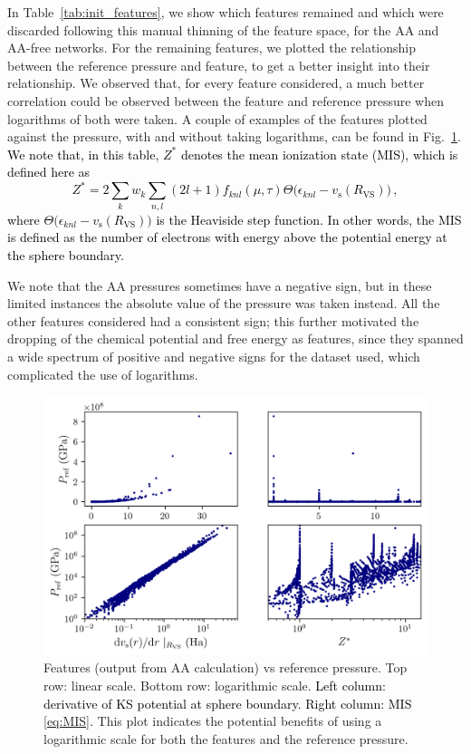 \documentclass[%
 preprint,
 superscriptaddress,
 amsmath,amssymb,
longbibliography,
]{revtex4-2}
\newcommand{\RWS}{R_\textrm{VS}}
\newcommand{\T}{\tau}
\newcommand{\change}[1]{\textcolor{black}{#1}}
\begin{document}
In Table~\ref{tab:init_features}, we show which features remained and which were discarded following this manual thinning of the feature space, for the AA and AA-free networks. For the remaining features, we plotted the relationship between the reference pressure and feature, to get a better insight into their relationship. We observed that, for every feature considered, a much better correlation could be observed between the feature and reference pressure when logarithms of both were taken. A couple of examples of the features plotted against the pressure, with and without taking logarithms, can be found in Fig.~\ref{fig:feature_correlation}. \change{ We note that, in this table, $Z^*$ denotes the mean ionization state (MIS), which is defined here as
\begin{equation} \label{eq:MIS}
    Z^* = 2\sum_{k} w_k \sum_{n,l} (2l+1) f_{knl}(\mu, \T) \Theta \big(\epsilon_{knl} - v_\textrm{s}(\RWS)\big)\,,
\end{equation}
where $\Theta\big(\epsilon_{knl} - v_\textrm{s}(\RWS)\big)$ is the Heaviside step function. In other words, the MIS is defined as the number of electrons with energy above the potential energy at the sphere boundary.}

We note that the AA pressures sometimes have a negative sign, but in these limited instances the absolute value of the pressure was taken instead. All the other features considered had a consistent sign; this further motivated the dropping of the chemical potential and free energy as features, since they spanned a wide spectrum of positive and negative signs for the dataset used, which complicated the use of logarithms.

\begin{figure}
    \centering
    \includegraphics{../figs/corr_plot_08_09.png}
    \caption{Features (output from AA calculation) vs reference pressure. Top row: linear scale. Bottom row: logarithmic scale. \change{Left column: derivative of KS potential at sphere boundary. Right column: MIS \eqref{eq:MIS}.} This plot indicates the potential benefits of using a logarithmic scale for both the features and the reference pressure.}
    \label{fig:feature_correlation}
\end{figure}
\end{document}
